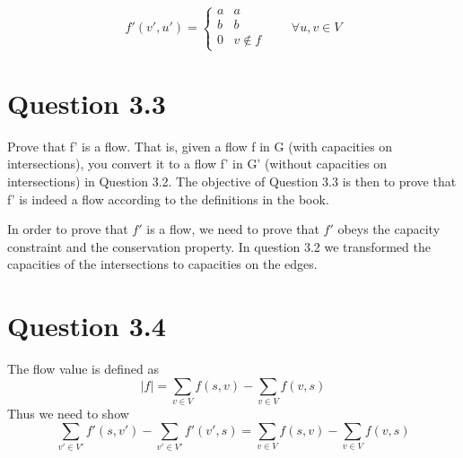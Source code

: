 \documentclass[10pt]{article}
\begin{document}
\begin{equation} 
f'(v',u') = 
\left\{
\begin{array}{rl} 
  a & a \\
  b & b \\
  0 & v \notin  f 
\end{array} 
\right. \qquad \forall u,v \in V
\end{equation} 

\section*{Question 3.3} %
\label{sec:question_3_3}
Prove that f' is a flow. That is, given a flow f in G (with capacities on intersections), you convert it to a flow f' in G' (without capacities on intersections) in Question 3.2. The objective of Question 3.3 is then to prove that f' is indeed a flow according to the definitions in the book.

In order to prove that $f'$ is a flow, we need to prove that $f'$ obeys the capacity constraint and the conservation property. In question 3.2 we transformed the capacities of the intersections to capacities on the edges. 


\section*{Question 3.4} %
\label{sec:question_3_4}
The flow value is defined as
\begin{equation}
 |f| = \sum_{v \in V} f(s,v) - \sum_{v \in V} f(v,s)
\end{equation}
Thus we need to show
\begin{equation}
  \sum_{v' \in V'} f'(s,v') - \sum_{v' \in V'} f'(v',s) =   \sum_{v \in V} f(s,v) - \sum_{v \in V} f(v,s)
\end{equation}

% 



\appendix
\end{document}
